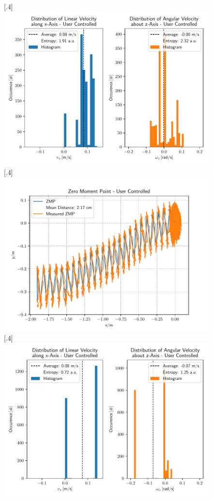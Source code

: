 \begin{figure}[h]
	[.4\linewidth]{\includegraphics[scale=.35]{chapters/05_experiments/01_user_controlled_walking/02_test_environment/obstacle_walk_02_entropy.pdf}}
	[.4\linewidth]{\includegraphics[scale=.35]{chapters/05_experiments/01_user_controlled_walking/02_test_environment/out_of_sight_walk_01_zmp.pdf}}
	[.4\linewidth]{\includegraphics[scale=.35]{chapters/05_experiments/01_user_controlled_walking/02_test_environment/out_of_sight_walk_01_entropy.pdf}}
	\caption{}
	\label{fig::512_uc_basic}
\end{figure} 